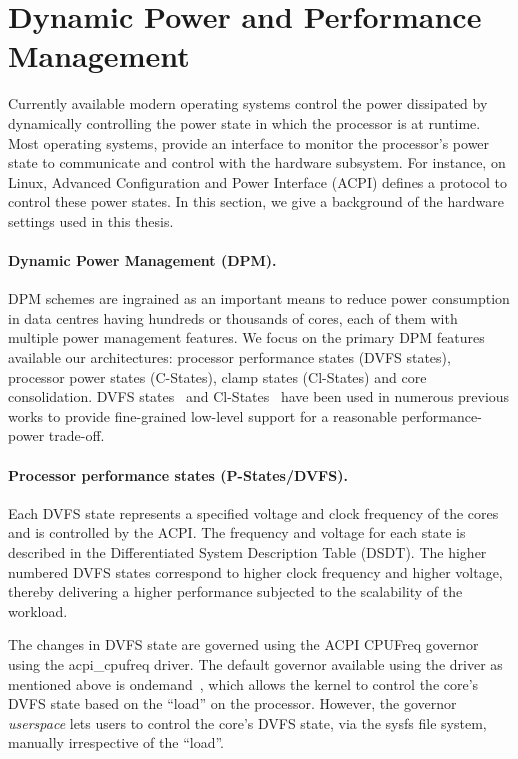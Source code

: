 \section{Dynamic Power and Performance Management} 
\label{section: Background} 

Currently available modern operating systems control the power dissipated by dynamically
controlling the power state in which the processor is at runtime.  Most operating systems,
provide an interface to monitor the processor's power state to communicate and control
with the hardware subsystem. For instance, on \textsf{Linux}, Advanced Configuration and
Power Interface (ACPI) defines a protocol to control these power states. In this section,
we give a background of the hardware settings used in this thesis.

\paragraph*{Dynamic Power Management (DPM).} DPM schemes are ingrained as an important
means to reduce power consumption in data centres having hundreds or thousands of cores,
each of them with multiple power management features. We focus on the primary DPM features
available our architectures: processor performance states (DVFS states), processor power states
(C-States), clamp states (Cl-States) and core consolidation.
DVFS states~\citep{Eric2009TheSearch, Su:2014:POP:2742155.2742200, Cochran:2011:PCA:2155620.2155641, Huang2000AManagement,Isci2006AnBudget, 6008553,  Singh2009RealCounters} and
Cl-States~\citep{Olsen:2006:PEP:1137248.1137532} have been used in numerous previous works
to provide fine-grained low-level support for a reasonable performance-power trade-off.  

\paragraph*{Processor performance states (P-States/DVFS).} Each DVFS state represents a
specified voltage and clock frequency of the cores~\citep{acpikernel} and is controlled by
the ACPI.  The frequency and voltage for
each state is described in the Differentiated System Description Table (DSDT).  The higher
numbered DVFS states correspond to higher clock frequency and higher voltage, thereby
delivering a higher performance subjected to the scalability of the workload.

The changes in DVFS state are governed using the ACPI \textsf{CPUFreq} governor using the
\textsf{acpi\_cpufreq} driver.  The default governor available using the driver as
mentioned above is \textsf{ondemand}~\citep{ondemand}, which allows the kernel to control
the core's DVFS state based on the ``load'' on the processor. However, the governor
\textit{userspace} lets users to control the core's DVFS state, via the \textsf{sysfs}
file system, manually irrespective of the ``load''.

